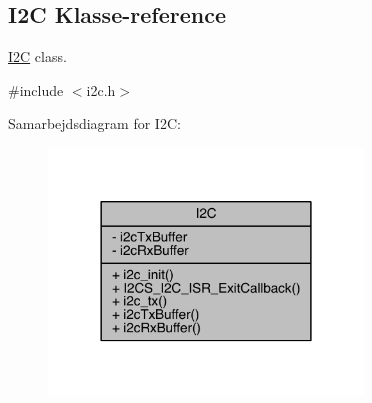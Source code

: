 \hypertarget{class_i2_c}{}\subsection{I2C Klasse-\/reference}
\label{class_i2_c}


\hyperlink{class_i2_c}{I2C} class.  




{\ttfamily \#include $<$i2c.\+h$>$}



Samarbejdsdiagram for I2C\+:\nopagebreak
\begin{figure}[H]
\begin{center}
\leavevmode
\includegraphics[width=237pt]{df/d70/class_i2_c__coll__graph}
\end{center}
\end{figure}
